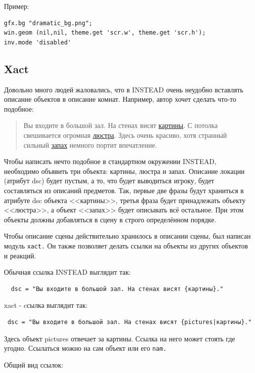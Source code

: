 \documentclass[12pt]{article}
\begin{document}
Пример:

\begin{verbatim}
gfx.bg "dramatic_bg.png";
win.geom (nil,nil, theme.get 'scr.w', theme.get 'scr.h');
inv.mode 'disabled'
\end{verbatim}

\subsection{Xact}

Довольно много людей жаловались, что в INSTEAD очень неудобно вставлять описание объектов в описание комнат. Например, автор хочет сделать что-то подобное:

\begin{quote}
 Вы входите в большой зал. На стенах висят \href{}{картины}. С потолка свешивается огромная \href{}{люстра}. Здесь очень красиво, хотя странный сильный \href{}{запах} немного портит впечатление.
\end{quote}

Чтобы написать нечто подобное в стандартном окружении INSTEAD, необходимо объявить три объекта: картины, люстра и запах. Описание локации (атрибут dsc) будет пустым, а то, что будет выводиться игроку, будет составляться из описаний предметов. Так, первые две фразы будут храниться в атрибуте dsc объекта <<картины>>, третья фраза будет принадлежать объекту <<люстра>>, а объект <<запах>> будет описывать всё остальное. При этом объекты должны добавляться в сцену в строго определённом порядке.

Чтобы описание сцены действительно хранилось в описании сцены, был написан модуль \verb/xact./ Он также позволяет делать ссылки на объекты из других объектов и реакций.

Обычная ссылка INSTEAD выглядит так:

\begin{verbatim}
  dsc = "Вы входите в большой зал. На стенах висят {картины}."
\end{verbatim}

xact - cсылка выглядит так:

\begin{verbatim}
 dsc = "Вы входите в большой зал. На стенах висят {pictures|картины}."
\end{verbatim}

Здесь объект pictures отвечает за картины. Ссылка на него может стоять где угодно. Ссылаться можно на сам объект или его \verb/nam./

Общий вид ссылок:
\end{document}

